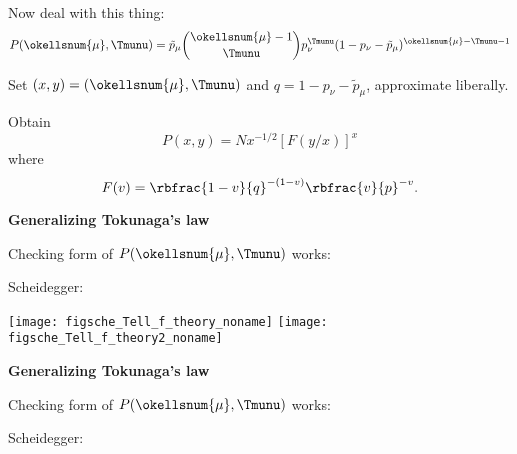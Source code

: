 \begin{frame}[label=]
\begin{frame}[label=]
\begin{frame}[label=]
\begin{frame}[label=]
\begin{frame}[label=]
\begin{frame}[label=]
\begin{frame}[label=]
\begin{frame}[label=]
\begin{frame}[label=]
\begin{frame}[label=]
\begin{frame}[label=]
\begin{frame}[label=]
\begin{frame}[label=]
\begin{frame}[label=]
\begin{frame}[label=]
\begin{frame}[label=]
\begin{frame}[label=]
\begin{frame}[label=]
\begin{frame}[label=]
\begin{frame}[label=]
\begin{frame}[label=]
\begin{frame}[label=]
\begin{frame}[label=]
\begin{frame}[label=]
\begin{frame}[label=]
\begin{frame}[label=]
\begin{frame}[label=]
\begin{frame}[label=]
\begin{frame}[label=]
\begin{frame}[label=]
\begin{frame}[label=]
\begin{frame}[label=]
\begin{frame}[label=]
\begin{frame}[label=]
\begin{frame}[label=]
\begin{frame}[label=]
\begin{frame}[label=]
\begin{frame}[label=]
\begin{frame}[label=]
\begin{frame}[label=]
\begin{frame}[label=]
\begin{frame}[label=]
\begin{frame}[label=]
\begin{frame}[label=]
\begin{frame}[label=]
\begin{frame}[label=]
\begin{frame}[label=]
\begin{frame}[label=]
\begin{frame}[label=]
\begin{frame}[label=]
\begin{frame}[label=]
\begin{frame}[label=]
\begin{frame}[label=]
\begin{frame}[label=]
\begin{frame}[label=]
\begin{frame}[label=]
    Now deal with this thing:
    $$
    P(\okellsnum{\mu},\Tmunu) = \tilde{p}_{\mu}
    \binom{\okellsnum{\mu} - 1}{\Tmunu}
    p_{\nu}^{\Tmunu}
    ( 1 - p_\nu - \tilde{p}_{\mu})^{\okellsnum{\mu} - \Tmunu - 1}
    $$
  
    Set $(x,y) = (\okellsnum{\mu}, \Tmunu)$ and $q = 1 - p_\nu - \tilde{p}_{\mu}$,
    approximate liberally.
  
    Obtain
    $$
    P(x,y) = N x^{-1/2} \left[ F(y/x) \right]^{x}
    $$
    where
    $$
    F(v) = \rbfrac{1-v}{q}^{-(1-v)} \rbfrac{v}{p}^{-v}.
    $$
  


\begin{frame}[label=]
  \textbf{Generalizing Tokunaga's law}

  
   Checking form of $P(\okellsnum{\mu},\Tmunu)$ works:
  

  Scheidegger:

    \texttt{[image: figsche\_Tell\_f\_theory\_noname]}
    \texttt{[image: figsche\_Tell\_f\_theory2\_noname]}


\begin{frame}[label=]
  \textbf{Generalizing Tokunaga's law}

  
   Checking form of $P(\okellsnum{\mu},\Tmunu)$ works:
  

  Scheidegger:
  

\end{frame}
\end{frame}
\end{frame}
\end{frame}
\end{frame}
\end{frame}
\end{frame}
\end{frame}
\end{frame}
\end{frame}
\end{frame}
\end{frame}
\end{frame}
\end{frame}
\end{frame}
\end{frame}
\end{frame}
\end{frame}
\end{frame}
\end{frame}
\end{frame}
\end{frame}
\end{frame}
\end{frame}
\end{frame}
\end{frame}
\end{frame}
\end{frame}
\end{frame}
\end{frame}
\end{frame}
\end{frame}
\end{frame}
\end{frame}
\end{frame}
\end{frame}
\end{frame}
\end{frame}
\end{frame}
\end{frame}
\end{frame}
\end{frame}
\end{frame}
\end{frame}
\end{frame}
\end{frame}
\end{frame}
\end{frame}
\end{frame}
\end{frame}
\end{frame}
\end{frame}
\end{frame}
\end{frame}
\end{frame}
\end{frame}
\end{frame}
\end{frame}
